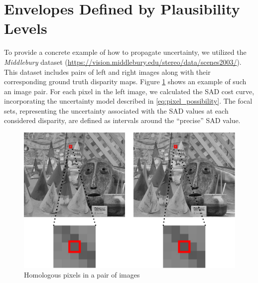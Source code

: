 \section{Envelopes Defined by Plausibility Levels}
To provide a concrete example of how to propagate uncertainty, we utilized the \textit{Middlebury} dataset (\url{https://vision.middlebury.edu/stereo/data/scenes2003/}). This dataset includes pairs of left and right images along with their corresponding ground truth disparity maps. Figure \ref{fig:Cones} shows an example of such an image pair.
For each pixel in the left image, we calculated the SAD cost curve, incorporating the uncertainty model described in \eqref{eq:pixel_possibility}. The focal sets, representing the uncertainty associated with the SAD values at each considered disparity, are defined as intervals around the ``precise'' SAD value.

\begin{figure}[ht]
  \centering
  \includegraphics[width=0.8\linewidth]{Images/Chap_4/Cones.png}
  \caption{Homologous pixels in a pair of images}\label{fig:Cones}
\end{figure}

